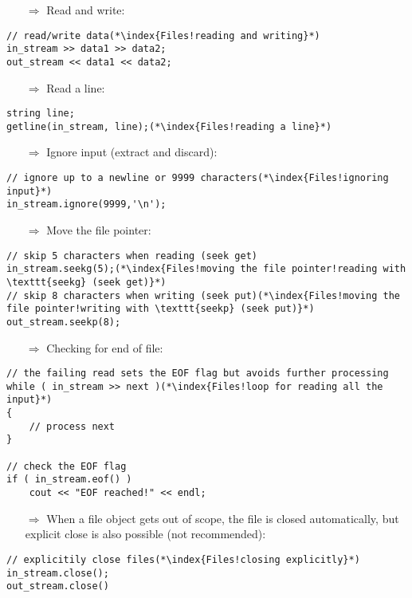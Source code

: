 \documentclass[10pt]{article}
\begin{document}
\begin{enumerate}
\item[$\Rightarrow$] Read and write:
\end{enumerate}
\begin{lstlisting}
// read/write data(*\index{Files!reading and writing}*)
in_stream >> data1 >> data2;
out_stream << data1 << data2;
\end{lstlisting}
\begin{enumerate}
\item[$\Rightarrow$] Read a line:
\end{enumerate}
\begin{lstlisting}
string line;
getline(in_stream, line);(*\index{Files!reading a line}*)
\end{lstlisting}
\begin{enumerate}
\item[$\Rightarrow$] Ignore input (extract and discard):
\end{enumerate}
\begin{lstlisting}
// ignore up to a newline or 9999 characters(*\index{Files!ignoring input}*)
in_stream.ignore(9999,'\n');
\end{lstlisting}
\begin{enumerate}
\item[$\Rightarrow$] Move the file pointer:
\end{enumerate}
\begin{lstlisting}
// skip 5 characters when reading (seek get)
in_stream.seekg(5);(*\index{Files!moving the file pointer!reading with \texttt{seekg} (seek get)}*)
// skip 8 characters when writing (seek put)(*\index{Files!moving the file pointer!writing with \texttt{seekp} (seek put)}*)
out_stream.seekp(8);
\end{lstlisting}
\begin{enumerate}
\item[$\Rightarrow$] Checking for end of file:
\end{enumerate}
\begin{lstlisting}
// the failing read sets the EOF flag but avoids further processing
while ( in_stream >> next )(*\index{Files!loop for reading all the input}*)
{
    // process next
}

// check the EOF flag
if ( in_stream.eof() )
    cout << "EOF reached!" << endl;
\end{lstlisting}
\begin{enumerate}
\item[$\Rightarrow$] When a file object gets out of scope, the file is closed automatically, but explicit
close is also possible (not recommended):
\end{enumerate}
\begin{lstlisting}
// explicitily close files(*\index{Files!closing explicitly}*)
in_stream.close();
out_stream.close()
\end{lstlisting}
%
%
\end{document}
